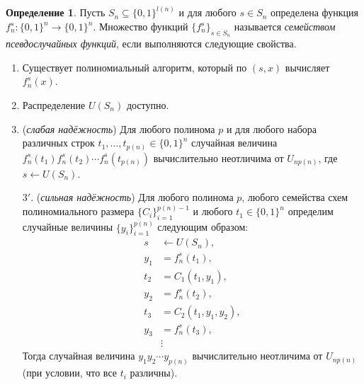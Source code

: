 \documentclass[12pt,a4paper]{article}
\newcommand{\bits}{\{0,1\}}
\theoremstyle{definition}
\newtheorem{definition}{Определение}[section]
\theoremstyle{plain}
\theoremstyle{remark}
\begin{document}
\begin{definition}
Пусть $S_n \subseteq\bits^{l(n)}$ и для любого $s\in S_n$ определена функция $f^s_n: \bits^n\to\bits^n$.
Множество функций $\{f^s_n\}_{s\in S_n}$ называется \emph{семейством псевдослучайных функций}, если 
выполняются следующие свойства.
\begin{enumerate}
\item Существует полиномиальный алгоритм, который по $(s, x)$ вычисляет $f^s_n(x)$.
\item Распределение $U(S_n)$ доступно.
\item (\emph{слабая надёжность}) Для любого полинома $p$ и для любого набора различных 
строк $t_1,\dotsc, t_{p(n)}\in \bits^n$ случайная величина $f^s_n(t_1)f^s_n(t_2)\dotsb f^s_n(t_{p(n)})$ 
вычислительно неотличима от $U_{np(n)}$, где $s\gets U(S_n)$.
\item[$3'$.] (\emph{сильная надёжность}) Для любого полинома $p$, любого семейства схем полиномиального размера
$\{C_i\}_{i=1}^{p(n) - 1}$ и любого $t_1\in\{0,1\}^n$ определим случайные величины 
$\{y_i\}_{i=1}^{p(n)}$ следующим образом:
$$
\begin{aligned}
s   &\gets U(S_n),\\
y_1 &= f^s_n(t_1),\\
t_2 &= C_1(t_1, y_1),\\
y_2 &= f^s_n(t_2),\\
t_3 &= C_2(t_1, y_1, y_2),\\
y_3 &= f^s_n(t_3),\\
&\vdots
\end{aligned}
$$
Тогда случайная величина $y_1y_2\dotsb y_{p(n)}$ вычислительно неотличима от $U_{np(n)}$ (при условии, что все $t_i$ различны).
\end{enumerate}
\end{definition}
\end{document}
